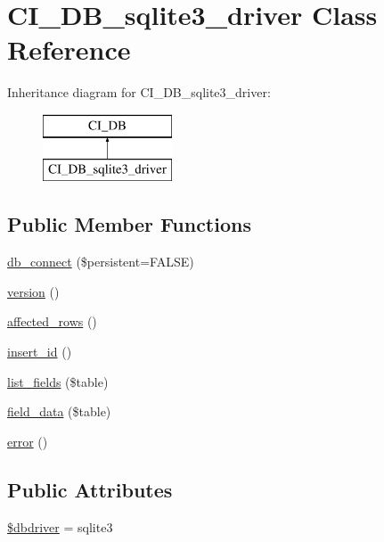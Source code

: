 \hypertarget{class_c_i___d_b__sqlite3__driver}{}\section{C\+I\+\_\+\+D\+B\+\_\+sqlite3\+\_\+driver Class Reference}
\label{class_c_i___d_b__sqlite3__driver}
Inheritance diagram for C\+I\+\_\+\+D\+B\+\_\+sqlite3\+\_\+driver\+:\begin{figure}[H]
\begin{center}
\leavevmode
\includegraphics[height=2.000000cm]{class_c_i___d_b__sqlite3__driver}
\end{center}
\end{figure}
\subsection*{Public Member Functions}
\begin{DoxyCompactItemize}
\item 
\mbox{\hyperlink{class_c_i___d_b__sqlite3__driver_a52bf595e79e96cc0a7c907a9b45aeb4d}{db\+\_\+connect}} (\$persistent=F\+A\+L\+SE)
\item 
\mbox{\hyperlink{class_c_i___d_b__sqlite3__driver_a6080dae0886626b9a4cedb29240708b1}{version}} ()
\item 
\mbox{\hyperlink{class_c_i___d_b__sqlite3__driver_a77248aaad33eb132c04cc4aa3f4bc8cb}{affected\+\_\+rows}} ()
\item 
\mbox{\hyperlink{class_c_i___d_b__sqlite3__driver_a933f2cde8dc7f87875e257d0a4902e99}{insert\+\_\+id}} ()
\item 
\mbox{\hyperlink{class_c_i___d_b__sqlite3__driver_aef08cd376b16b24608100ca0e3f2f85b}{list\+\_\+fields}} (\$table)
\item 
\mbox{\hyperlink{class_c_i___d_b__sqlite3__driver_a90355121e1ed009e0efdbd544ab56efa}{field\+\_\+data}} (\$table)
\item 
\mbox{\hyperlink{class_c_i___d_b__sqlite3__driver_a43b8d30b879d4f09ceb059b02af2bc02}{error}} ()
\end{DoxyCompactItemize}
\subsection*{Public Attributes}
\begin{DoxyCompactItemize}
\item 
\mbox{\hyperlink{class_c_i___d_b__sqlite3__driver_a0cde2a16322a023d040aa7f725877597}{\$dbdriver}} = \textquotesingle{}sqlite3\textquotesingle{}
\end{DoxyCompactItemize}
